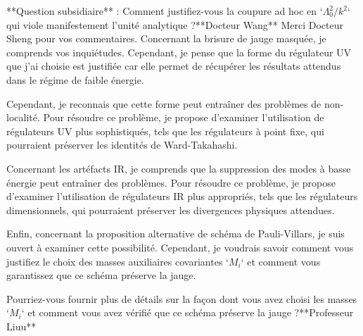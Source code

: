 **Question subsidiaire** :  
Comment justifiez-vous la coupure ad hoc en `$\Lambda_0^2/k^2$` qui viole manifestement l'unité analytique ?**Docteur Wang**
Merci Docteur Sheng pour vos commentaires. Concernant la brisure de jauge masquée, je comprends vos inquiétudes. Cependant, je pense que la forme du régulateur UV que j'ai choisie est justifiée car elle permet de récupérer les résultats attendus dans le régime de faible énergie.

Cependant, je reconnais que cette forme peut entraîner des problèmes de non-localité. Pour résoudre ce problème, je propose d'examiner l'utilisation de régulateurs UV plus sophistiqués, tels que les régulateurs à point fixe, qui pourraient préserver les identités de Ward-Takahashi.

Concernant les artéfacts IR, je comprends que la suppression des modes à basse énergie peut entraîner des problèmes. Pour résoudre ce problème, je propose d'examiner l'utilisation de régulateurs IR plus appropriés, tels que les régulateurs dimensionnels, qui pourraient préserver les divergences physiques attendues.

Enfin, concernant la proposition alternative de schéma de Pauli-Villars, je suis ouvert à examiner cette possibilité. Cependant, je voudrais savoir comment vous justifiez le choix des masses auxiliaires covariantes `$M_i$` et comment vous garantissez que ce schéma préserve la jauge.

Pourriez-vous fournir plus de détails sur la façon dont vous avez choisi les masses `$M_i$` et comment vous avez vérifié que ce schéma préserve la jauge ?**Professeur Liuu**

